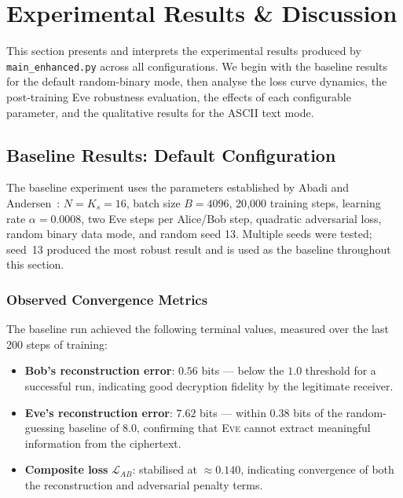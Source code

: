 \documentclass[12pt, a4paper]{article}
\newcommand{\eve}{\textsc{Eve}}
\newcommand{\code}[1]{\texttt{\color{CodeRed}#1}}
\begin{document}
\newpage
\section{Experimental Results \& Discussion}
\label{sec:results}

This section presents and interprets the experimental results produced
by \code{main\_enhanced.py} across all configurations. We begin with
the baseline results for the default random-binary mode, then analyse
the loss curve dynamics, the post-training Eve robustness evaluation,
the effects of each configurable parameter, and the qualitative
results for the ASCII text mode.

\subsection{Baseline Results: Default Configuration}
\label{subsec:baseline_results}

The baseline experiment uses the parameters established by Abadi and
Andersen~\cite{abadi2016learning}: $N = K_s = 16$, batch size $B = 4096$,
20{,}000 training steps, learning rate $\alpha = 0.0008$, two Eve steps
per Alice/Bob step, quadratic adversarial loss, random binary data mode,
and random seed 13. Multiple seeds were tested; seed~13 produced the most
robust result and is used as the baseline throughout this section.

\subsubsection*{Observed Convergence Metrics}

The baseline run achieved the following terminal values, measured over
the last 200 steps of training:

\begin{itemize}[leftmargin=1.8em, itemsep=4pt]
  \item \textbf{Bob's reconstruction error}: $\mathbf{0.56}$ bits ---
        below the $1.0$ threshold for a successful run, indicating
        good decryption fidelity by the legitimate receiver.
  \item \textbf{Eve's reconstruction error}: $\mathbf{7.62}$ bits ---
        within $0.38$ bits of the random-guessing baseline of $8.0$,
        confirming that \eve{} cannot extract meaningful information from
        the ciphertext.
  \item \textbf{Composite loss} $\mathcal{L}_{AB}$: stabilised at
        $\approx 0.140$, indicating convergence of both the reconstruction
        and adversarial penalty terms.
\end{itemize}
\end{document}
